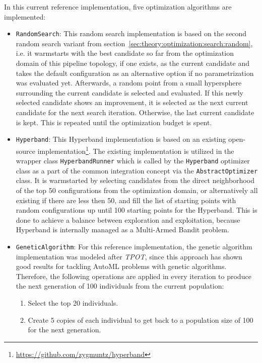 In this current reference implementation, five optimization algorithms are implemented:
\begin{itemize}
    \item \texttt{RandomSearch}: This random search implementation is based on the second random search variant from section~\ref{sec:theory:optimization:search:random}, i.e. it warmstarts with the best candidate so far from the optimization domain of this pipeline topology, if one exists, as the current candidate and takes the default configuration as an alternative option if no parametrization was evaluated yet.
    Afterwards, a random point from a small hypersphere surrounding the current candidate is selected and evaluated.
    If this newly selected candidate shows an improvement, it is selected as the next current candidate for the next search iteration.
    Otherwise, the last current candidate is kept.
    This is repeated until the optimization budget is spent.
    \item \texttt{Hyperband}: This Hyperband implementation is based on an existing open-source implementation\footnote{\url{https://github.com/zygmuntz/hyperband}}.
    The existing implementation is utilized in the wrapper class \texttt{HyperbandRunner} which is called by the \texttt{Hyperband} optimizer class as a part of the common integration concept via the \texttt{AbstractOptimizer} class.
    It is warmstarted by selecting candidates from the direct neighborhood of the top 50 configurations from the optimization domain, or alternatively all existing if there are less then 50, and fill the list of starting points with random configurations up until 100 starting points for the Hyperband.
    This is done to achieve a balance between exploration and exploitation, because Hyperband is internally managed as a Multi-Armed Bandit problem.
    \item \texttt{GeneticAlgorithm}: For this reference implementation, the genetic algorithm implementation was modeled after \textit{TPOT}, since this approach has shown good results for tackling AutoML problems with genetic algorithms.
    Therefore, the following operations are applied in every iteration to produce the next generation of 100 individuals from the current population:
        \begin{enumerate}
            \item Select the top 20 individuals.
            \item Create 5 copies of each individual to get back to a population size of 100 for the next generation.

\end{enumerate}
\end{itemize}
